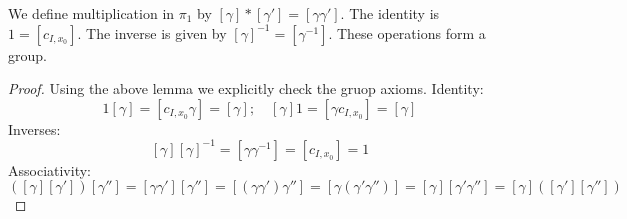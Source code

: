 \begin{theorem}
	We define multiplication in \( \pi_1 \) by \( [\gamma] \ast [\gamma'] = [\gamma \gamma'] \).
	The identity is \( 1 = [c_{I,x_0}] \).
	The inverse is given by \( [\gamma]^{-1} = [\gamma^{-1}] \).
	These operations form a group.
\end{theorem}
\begin{proof}
	Using the above lemma we explicitly check the gruop axioms.
	Identity:
	\[ 1 [\gamma] = [c_{I,x_0}\gamma] = [\gamma];\quad [\gamma] 1 = [\gamma c_{I,x_0}] = [\gamma] \]
	Inverses:
	\[ [\gamma] [\gamma]^{-1} = [\gamma \gamma^{-1}] = [c_{I,x_0}] = 1 \]
	Associativity:
	\[ ([\gamma][\gamma'])[\gamma''] = [\gamma\gamma'][\gamma''] = [(\gamma\gamma')\gamma''] = [\gamma(\gamma'\gamma'')] = [\gamma][\gamma'\gamma''] = [\gamma]([\gamma'][\gamma'']) \]
\end{proof}

